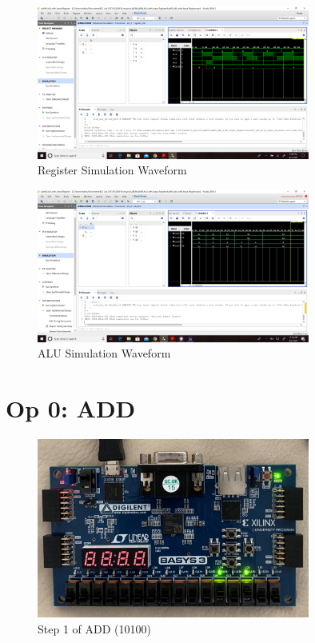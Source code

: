 \documentclass[11pt]{article}
\begin{document}
\begin{figure}[ht]\centering
	\includegraphics[width=0.8\textwidth,trim=19.5cm 12cm 0.6cm 4.8cm,clip]{register_test_screenshot}
	\caption{Register Simulation Waveform}
	\label{fig:register_sim_wave_Screenshot}			
\end{figure}

\begin{figure}[ht]\centering
	\includegraphics[width=0.8\textwidth,trim=19.5cm 12cm 3cm 4.8cm,clip]{alu_test_screenshot(1)}
	\caption{ALU Simulation Waveform}
	\label{fig:alu_sim_wave_Screenshot}			
\end{figure}
\clearpage 

\section*{Op 0: ADD}

\begin{figure}[ht]\centering
	\includegraphics[width=0.8\textwidth,trim=0cm 0cm 0cm 0cm,clip]{add_step_1}
	\caption{Step 1 of ADD (10100)}
	\label{fig:add_step_1}			
\end{figure}
\end{document}
